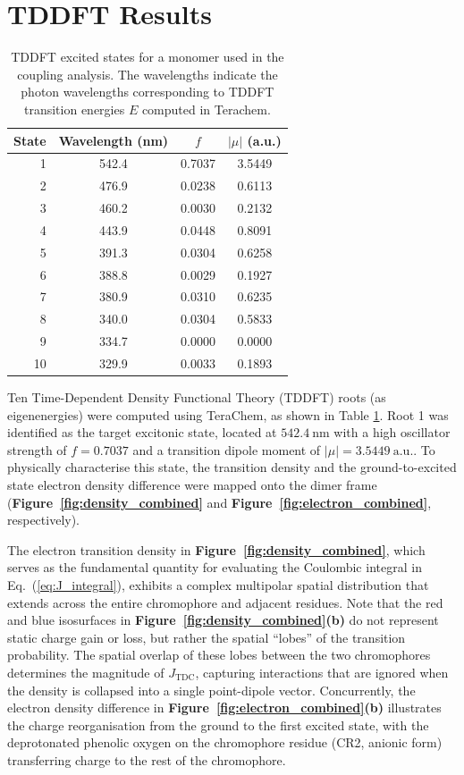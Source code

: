 \documentclass[journal=jpclcd, manuscript=letter, layout=twocolumn, doi=true]{achemso}
\begin{document}
\section{TDDFT Results}

\begin{table}[h]
\centering
\caption{TDDFT excited states for a monomer used in the coupling analysis. The wavelengths indicate the photon wavelengths corresponding to TDDFT transition energies $E$ computed in Terachem.}
\label{tab:roots}
\begin{tabular}{rccc}
\toprule
State & Wavelength (nm) & $f$ & $|\mu|$ (a.u.) \\
\midrule
1  & 542.4 & 0.7037 & 3.5449 \\
2  & 476.9 & 0.0238 & 0.6113 \\
3  & 460.2 & 0.0030 & 0.2132 \\
4  & 443.9 & 0.0448 & 0.8091 \\
5  & 391.3 & 0.0304 & 0.6258 \\
6  & 388.8 & 0.0029 & 0.1927 \\
7  & 380.9 & 0.0310 & 0.6235 \\
8  & 340.0 & 0.0304 & 0.5833 \\
9  & 334.7 & 0.0000 & 0.0000 \\
10 & 329.9 & 0.0033 & 0.1893 \\
\bottomrule
\end{tabular}
\end{table}

Ten Time-Dependent Density Functional Theory (TDDFT) roots (as eigenenergies) were computed using TeraChem, as shown in Table \ref{tab:roots}. Root 1 was identified as the target excitonic state, located at $542.4~\mathrm{nm}$ with a high oscillator strength of $f=0.7037$ and a transition dipole moment of $|\mu|=3.5449~\mathrm{a.u.}$. To physically characterise this state, the transition density and the ground-to-excited state electron density difference were mapped onto the dimer frame (\textbf{Figure~\ref{fig:density_combined}} and \textbf{Figure~\ref{fig:electron_combined}}, respectively). 

The electron transition density in \textbf{Figure~\ref{fig:density_combined}}, which serves as the fundamental quantity for evaluating the Coulombic integral in Eq.~(\ref{eq:J_integral}), exhibits a complex multipolar spatial distribution that extends across the entire chromophore and adjacent residues. Note that the red and blue isosurfaces in \textbf{Figure~\ref{fig:density_combined}(b)} do not represent static charge gain or loss, but rather the spatial ``lobes'' of the transition probability. The spatial overlap of these lobes between the two chromophores determines the magnitude of $J_{\text{TDC}}$, capturing interactions that are ignored when the density is collapsed into a single point-dipole vector. Concurrently, the electron density difference in \textbf{Figure~\ref{fig:electron_combined}(b)} illustrates the charge reorganisation from the ground to the first excited state, with the deprotonated phenolic oxygen on the chromophore residue (CR2, anionic form) transferring charge to the rest of the chromophore. 
\end{document}
